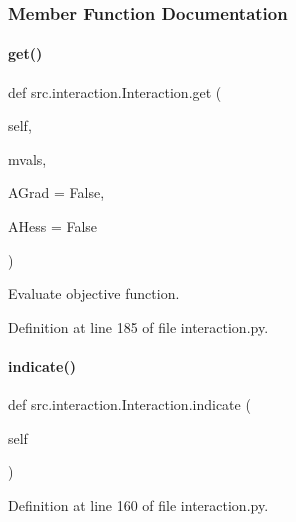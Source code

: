 \subsubsection{Member Function Documentation}
\mbox{\label{classsrc_1_1interaction_1_1Interaction_a38b00f6a1a99561520b30f6995492de9}} 
\paragraph{\texorpdfstring{get()}{get()}}
{\footnotesize\ttfamily def src.\+interaction.\+Interaction.\+get (\begin{DoxyParamCaption}\item[{}]{self,  }\item[{}]{mvals,  }\item[{}]{A\+Grad = {\ttfamily False},  }\item[{}]{A\+Hess = {\ttfamily False} }\end{DoxyParamCaption})}



Evaluate objective function. 



Definition at line 185 of file interaction.\+py.

\mbox{\label{classsrc_1_1interaction_1_1Interaction_a701bc0f64d4ad094259c21a75d7addac}} 
\paragraph{\texorpdfstring{indicate()}{indicate()}}
{\footnotesize\ttfamily def src.\+interaction.\+Interaction.\+indicate (\begin{DoxyParamCaption}\item[{}]{self }\end{DoxyParamCaption})}



Definition at line 160 of file interaction.\+py.

